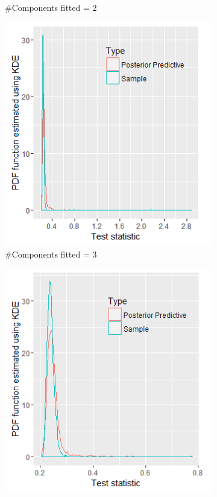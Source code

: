\begin{figure}[!htb]
\begin{subfigure}[b]{0.4\textwidth}
          \caption{\label{fig : ppc_blood_donor_2comp}\#Components fitted = 2}
	\end{subfigure}
	\begin{subfigure}[b]{0.4\textwidth}
		\includegraphics[width=\textwidth]{mainmatter/chapter_6_blood_donor/ppc_3comp.png}	
          \caption{\label{fig : ppc_blood_donor_3comp}\#Components fitted = 3}
	\end{subfigure}
	\begin{subfigure}[b]{0.4\textwidth}
		\includegraphics[width=\textwidth]{mainmatter/chapter_6_blood_donor/ppc_4comp.png}	

\end{subfigure}
\end{figure}

